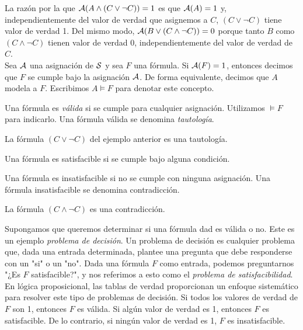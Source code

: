 \message{ !name(main.tex)}\documentclass[12pt,a4paper]{book}
\newcommand{\comillas}[1]{"#1"}
\begin{document}
    La razón por la que $\AA(A\wedge(C\vee\neg C))=1$ es que $\AA(A)=1$ y, independientemente del valor de verdad que asignemos a $C$, $(C\vee\neg C)$
    tiene valor de verdad 1. Del mismo modo, $\AA(B\vee(C\wedge\neg C))=0$ porque tanto $B$ como $(C\wedge\neg C)$ tienen valor de verdad 0, independientemente del
    valor de verdad de $C$.\\
    Sea $\AA$ una asignación de $\SS$ y sea $F$ una fórmula. Si $\AA(F)=1$, entonces decimos que $F$ se cumple bajo la asignación $\AA$. De forma equivalente,
    decimos que $A$ modela a $F$. Escribimos $A\models F$ para denotar este concepto.

    \begin{definicion}
        Una fórmula es \textit{válida} si se cumple para cualquier asignación. Utilizamos $\models F$ para indicarlo. Una fórmula válida se denomina
        \textit{tautología}.
    \end{definicion}

    \begin{ejemplo}
        La fórmula $(C\vee\neg C)$ del ejemplo anterior es una tautología.
    \end{ejemplo}

    \begin{definicion}[Satisfacibilidad]
        Una fórmula es satisfacible si se cumple bajo alguna condición.
    \end{definicion}

    \begin{definicion}
        Una fórmula es insatisfacible si no se cumple con ninguna asignación. Una fórmula insatisfacible se denomina contradicción.
    \end{definicion}

    \begin{ejemplo}
        La fórmula $(C\wedge\neg C)$ es una contradicción.
    \end{ejemplo}

    Supongamos que queremos determinar si una fórmula dad es válida o no. Este es un ejemplo \textit{problema de decisión}. Un problema de decisión es cualquier
    problema que, dada una entrada determinada, plantee una pregunta que debe responderse con un \comillas{si} o un \comillas{no}. Dada una fórmula $F$ como entrada,
    podemos preguntarnos \comillas{¿Es $F$ satisfacible?}, y nos referimos a esto como el \textit{problema de satisfacibilidad}. En lógica proposicional, las
    tablas de verdad proporcionan un enfoque sistemático para resolver este tipo de problemas de decisión. Si todos los valores de verdad de $F$ son 1, entonces
    $F$ es válida. Si algún valor de verdad es 1, entonces $F$ es satisfacible. De lo contrario, si ningún valor de verdad es 1, $F$ es insatisfacible.
\end{document}
